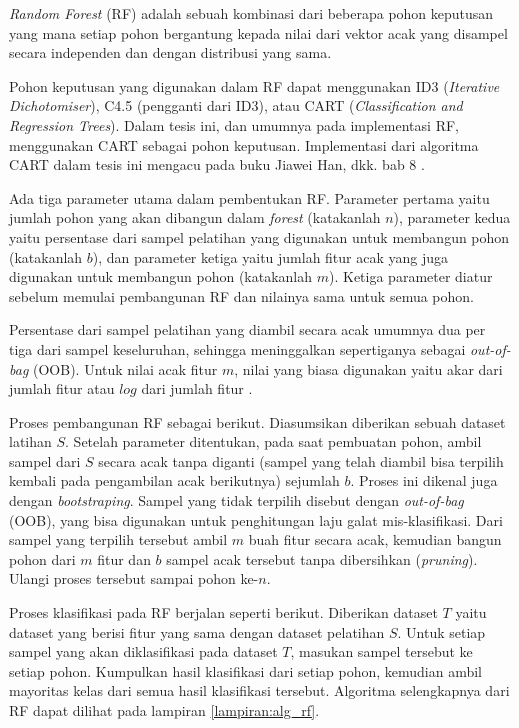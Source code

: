 \textit{Random Forest} (RF) \cite{breiman2001random}
adalah sebuah kombinasi dari beberapa pohon keputusan yang mana setiap pohon
bergantung kepada nilai dari vektor acak yang disampel secara independen dan
dengan distribusi yang sama.

Pohon keputusan yang digunakan dalam RF dapat menggunakan ID3
(\textit{Iterative Dichotomiser}), C4.5 (pengganti dari ID3), atau CART
(\textit{Classification and Regression Trees}).
Dalam tesis ini, dan umumnya pada implementasi RF, menggunakan CART sebagai
pohon keputusan.
Implementasi dari algoritma CART dalam tesis ini mengacu pada buku Jiawei Han,
dkk. bab 8 \cite{han2011data}.

Ada tiga parameter utama dalam pembentukan RF.
Parameter pertama yaitu jumlah pohon yang akan dibangun dalam \textit{forest}
(katakanlah $n$),
parameter kedua yaitu persentase dari sampel pelatihan yang digunakan untuk
membangun pohon (katakanlah $b$),
dan parameter ketiga yaitu jumlah fitur acak yang juga digunakan untuk
membangun pohon (katakanlah $m$).
Ketiga parameter diatur sebelum memulai pembangunan RF dan nilainya sama untuk
semua pohon.

Persentase dari sampel pelatihan yang diambil secara acak umumnya dua per tiga
dari sampel keseluruhan, sehingga meninggalkan sepertiganya sebagai
\textit{out-of-bag} (OOB).
Untuk nilai acak fitur $m$, nilai yang biasa digunakan yaitu akar dari jumlah
fitur atau $log$ dari jumlah fitur \cite{breiman2001random}.

Proses pembangunan RF sebagai berikut.
Diasumsikan diberikan sebuah dataset latihan $S$.
Setelah parameter ditentukan, pada saat pembuatan pohon, ambil sampel dari $S$
secara acak tanpa diganti (sampel yang telah diambil bisa terpilih kembali pada
pengambilan acak berikutnya) sejumlah $b$.
Proses ini dikenal juga dengan \textit{bootstraping}.
Sampel yang tidak terpilih disebut dengan \textit{out-of-bag} (OOB), yang
bisa digunakan untuk penghitungan laju galat mis-klasifikasi.
Dari sampel yang terpilih tersebut ambil $m$ buah fitur secara acak, kemudian
bangun pohon dari $m$ fitur dan $b$ sampel acak tersebut tanpa dibersihkan
(\textit{pruning}).
Ulangi proses tersebut sampai pohon ke-$n$.

Proses klasifikasi pada RF berjalan seperti berikut.
Diberikan dataset $T$ yaitu dataset yang berisi fitur yang sama dengan dataset
pelatihan $S$.
Untuk setiap sampel yang akan diklasifikasi pada dataset $T$, masukan sampel
tersebut ke setiap pohon.
Kumpulkan hasil klasifikasi dari setiap pohon, kemudian ambil mayoritas kelas
dari semua hasil klasifikasi tersebut.
Algoritma selengkapnya dari RF dapat dilihat pada lampiran
\ref{lampiran:alg_rf}.


